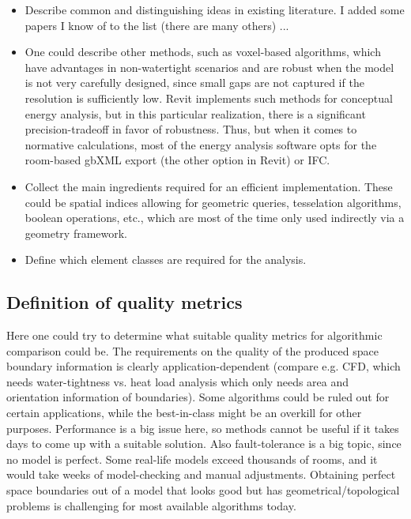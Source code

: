\documentclass{scrartcl}
\begin{document}
\begin{itemize}
\item Describe common and distinguishing ideas in existing literature. I added some papers I know of to the list (there are many others) ... \cite{bazjanac2010requirements,lilis2017automatic,rose2013algorithm,treeck2004simulation,treeck2010introduction}
\item One could describe other methods, such as voxel-based algorithms, which have advantages in non-watertight scenarios and are robust when the model is not very carefully designed, since small gaps are not captured if the resolution is sufficiently low. Revit implements such methods for conceptual energy analysis, but in this particular realization, there is a significant precision-tradeoff in favor of robustness. Thus, but when it comes to normative calculations, most of the energy analysis software opts for the room-based gbXML export (the other option in Revit) or IFC.
\item Collect the main ingredients required for an efficient implementation. These could be spatial indices allowing for geometric queries, tesselation algorithms, boolean operations, etc., which are most of the time only used indirectly via a geometry framework.
\item Define which element classes are required for the analysis.
\end{itemize}

\subsection{Definition of quality metrics}

Here one could try to determine what suitable quality metrics for algorithmic comparison could be. The requirements on the quality of the produced space boundary information is clearly application-dependent (compare e.g. CFD, which needs water-tightness vs. heat load analysis which only needs area and orientation information of boundaries). Some algorithms could be ruled out for certain applications, while the best-in-class might be an overkill for other purposes. Performance is a big issue here, so methods cannot be useful if it takes days to come up with a suitable solution. Also fault-tolerance is a big topic, since no model is perfect. Some real-life models exceed thousands of rooms, and it would take weeks of model-checking and manual adjustments. Obtaining perfect space boundaries out of a model that looks good but has geometrical/topological problems is challenging for most available algorithms today.
\end{document}
